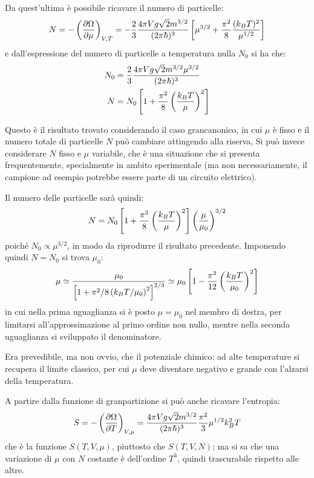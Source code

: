 Da quest'ultima è possibile ricavare il numero di particelle:
\begin{equation*}
N = - \left(\frac{\partial {\Omega}}{\partial {\mu}}\right)_{V,T} = - \frac{2}{3} \frac{4\pi V g \sqrt{2} m^{3/2}}{(2\pi \hbar)^3}\left[\mu^{3/2} + \frac{\pi^2}{8} \frac{(k_B T)^2}{\mu^{1/2}}\right]
\end{equation*}
e dall'espressione del numero di particelle a temperatura nulla $N_0$ si ha che:
\begin{align*}
N_0 &= \frac{2}{3} \frac{4\pi V g \sqrt{2} m^{3/2} \mu^{3/2}}{(2\pi \hbar)^3}\\
N &= N_0\left[1 + \frac{\pi^2}{8} \left(\frac{k_B T}{\mu}\right)^2\right]
\end{align*}

Questo è il risultato trovato considerando il caso grancanonico, in cui $\mu$ è fisso e il numero totale di particelle $N$ può cambiare attingendo alla riserva,
Si può invece considerare $N$ fisso e $\mu$ variabile, che è una situazione che si presenta frequentemente, specialmente in ambito sperimentale (ma non necessariamente, il campione ad esempio potrebbe essere parte di un circuito elettrico).

Il numero delle particelle sarà quindi:
\begin{equation*}
N = N_0\left[1 + \frac{\pi^2}{8} \left(\frac{k_B T}{\mu}\right)^2\right]\left(\frac{\mu}{\mu_0}\right)^{3/2}
\end{equation*}
poiché $N_0 \propto \mu^{3/2}$, in modo da riprodurre il risultato precedente. Imponendo quindi $N = N_0$ si trova $\mu_0$:
\begin{equation*}
\mu \simeq \frac{\mu_0}{\left[1 + {\pi^2}/{8} \left({k_B T}/{\mu_0}\right)^2\right]^{2/3}} \simeq \mu_0 \left[1 - \frac{\pi^2}{12} \left(\frac{k_B T}{\mu_0}\right)^2\right]
\end{equation*} 
in cui nella prima uguaglianza si è posto $\mu = \mu_0$ nel membro di destra, per limitarsi all'approssimazione al primo ordine non nullo, mentre nella seconda uguaglianza si sviluppato il denominatore.

Era prevedibile, ma non ovvio, che il potenziale chimico: ad alte temperature si recupera il limite classico, per cui $\mu$ deve diventare negativo e grande con l'alzarsi della temperatura.
\newline

A partire dalla funzione di granpartizione si può anche ricavare l'entropia:
\begin{equation*}
S = - \left(\frac{\partial {\Omega}}{\partial {T}}\right)_{V, \mu} = \frac{4\pi V g \sqrt{2} m^{3/2}}{(2\pi \hbar)^3} \frac{\pi^2}{3} \mu^{1/2} k_B^2 T 
\end{equation*}
che è la funzione $S(T,V,\mu)$, piuttosto che $S(T,V,N)$; ma si sa che una variazione di $ \mu $ con $  N $ costante è dell'ordine $ T^3 $, quindi trascurabile rispetto alle altre.

